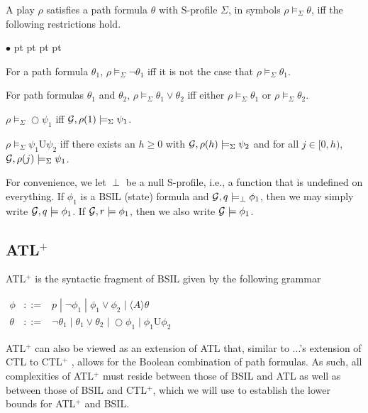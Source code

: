 \documentclass[11pt]{article}
\newcommand{\calg}{{\cal G}}
\newcommand{\until}{\textrm{U}} %
\newcommand{\wntil}{\textrm{W}} %
\newcommand{\nxt}{\bigcirc}
\newenvironment{list1}{\begin{list}{$\bullet$}
{\topsep 0 pt \parsep 0 pt \partopsep 0 pt \itemsep 0 pt}}{\end{list}}
\begin{document}
A play $\rho$ satisfies a path formula $\theta$ with S-profile $\Sigma$, 
in symbols $\rho\models_\Sigma\theta$, 
iff the following restrictions hold.
\begin{list1} 
\item For a path formula $\theta_1$, 
    $\rho\models_\Sigma\neg\theta_1$ iff
    it is not the case that $\rho\models_\Sigma\theta_1$.
\item For path formulas $\theta_1$ and $\theta_2$, 
    $\rho\models_\Sigma\theta_1\vee\theta_2$ iff
    either $\rho\models_\Sigma\theta_1$
    or $\rho\models_\Sigma\theta_2$.
\item $\rho\models_\Sigma\nxt\psi_1$
    iff $\calg,\rho(1)\models_\Sigma\psi_1$.
\item $\rho\models_\Sigma\psi_1\until\psi_2$
    iff there exists an $h\geq 0$ with $\calg,\rho(h)\models_\Sigma\psi_2$ 
    and for all $j\in [0,h)$, $\calg,\rho(j)\models_\Sigma\psi_1$.
\end{list1}
For convenience, we let $\perp$ be a null S-profile, 
i.e., a function that is undefined on everything. 
If $\phi_1$ is a BSIL (state) formula and $\calg,q\models_\perp\phi_1$,
then we may simply write $\calg,q\models\phi_1$.  
If $\calg,r\models\phi_1$, then we also write $\calg\models\phi_1$.  


\subsection{ATL$^+$}
ATL$^+$ is the syntactic fragment of BSIL given by the following grammar

\begin{center}
$\begin{array}{rcl}
\phi    & ::= & p\;|\; \neg \phi_1 \;|\; \phi_1\vee \phi_2 
    \;|\; \langle  A\rangle \theta
    \\
\theta  & ::= & \neg\theta_1 \;|\; \theta_1\vee \theta_2 
    \;|\; \nxt \phi_1
    \;|\; \phi_1\until \phi_2
\end{array}$
\end{center}

ATL$^+$ can also be viewed as an extension of ATL \cite{AHK02} that, similar to ...'s extension of CTL to CTL$^+$ \cite{BPM83,EH86}, allows for the Boolean combination of path formulas.
As such, all complexities of ATL$^+$ must reside between those of BSIL and ATL as well as between those of BSIL and CTL$^+$, which we will use to establish the lower bounds for ATL$^+$ and BSIL.
\end{document}
